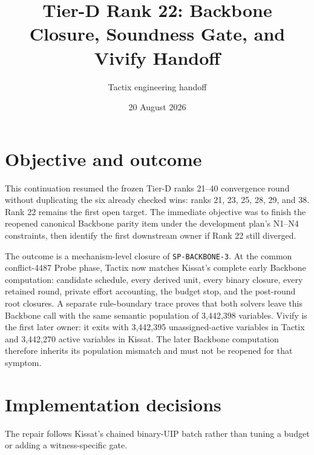 \documentclass[11pt]{article}
\title{Tier-D Rank 22: Backbone Closure, Soundness Gate, and Vivify Handoff}
\author{Tactix engineering handoff}
\date{20 August 2026}
\newcommand{\code}[1]{\texttt{#1}}
\begin{document}
\maketitle

\section*{Objective and outcome}
This continuation resumed the frozen Tier-D ranks 21--40 convergence round
without duplicating the six already checked wins: ranks 21, 23, 25, 28, 29,
and 38.  Rank 22 remains the first open target.  The immediate objective was
to finish the reopened canonical Backbone parity item under the development
plan's N1--N4 constraints, then identify the first downstream owner if Rank 22
still diverged.

The outcome is a mechanism-level closure of \code{SP-BACKBONE-3}.  At the
common conflict-4487 Probe phase, Tactix now matches Kissat's complete early
Backbone computation: candidate schedule, every derived unit, every binary
closure, every retained round, private effort accounting, the budget stop, and
the post-round root closures.  A separate rule-boundary trace proves that both
solvers leave this Backbone call with the same semantic population of
3,442,398 variables.  Vivify is the first later owner: it exits with 3,442,395
unassigned-active variables in Tactix and 3,442,270 active variables in Kissat.
The later Backbone computation therefore inherits its population mismatch and
must not be reopened for that symptom.

\section*{Implementation decisions}
The repair follows Kissat's chained binary-UIP batch rather than tuning a
budget or adding a witness-specific gate.
\end{document}

